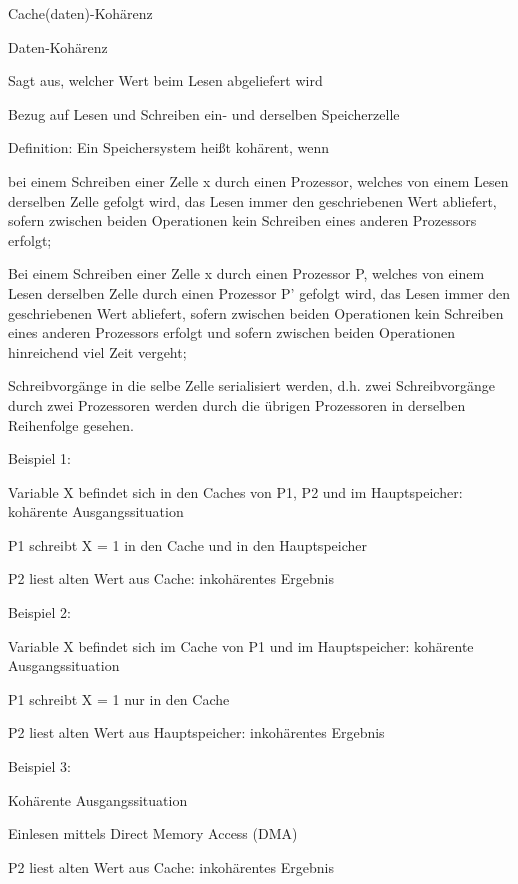 \documentclass[10pt,landscape]{article}
\begin{document}
\begin{multicols}{3}
  Cache(daten)-Kohärenz
  \begin{itemize*}
    \item Daten-Kohärenz
    \item Sagt aus, welcher Wert beim Lesen abgeliefert wird
    \item Bezug auf Lesen und Schreiben ein- und derselben Speicherzelle
    \item Definition: Ein Speichersystem heißt kohärent, wenn
    \item bei einem Schreiben einer Zelle x durch einen Prozessor, welches von einem Lesen derselben Zelle gefolgt wird, das Lesen immer den geschriebenen Wert abliefert, sofern zwischen beiden Operationen kein Schreiben eines anderen Prozessors erfolgt;
    \item Bei einem Schreiben einer Zelle x durch einen Prozessor P, welches von einem Lesen derselben Zelle durch einen Prozessor P’ gefolgt wird, das Lesen immer den geschriebenen Wert abliefert, sofern zwischen beiden Operationen kein Schreiben eines anderen Prozessors erfolgt und sofern zwischen beiden Operationen hinreichend viel Zeit vergeht;
    \item Schreibvorgänge in die selbe Zelle serialisiert werden, d.h. zwei Schreibvorgänge durch zwei Prozessoren werden durch die übrigen Prozessoren in derselben Reihenfolge gesehen.
    \item Beispiel 1: 
    \item Variable X befindet sich in den Caches von P1, P2 und im Hauptspeicher: kohärente Ausgangssituation
    \item P1 schreibt X = 1 in den Cache und in den Hauptspeicher
    \item P2 liest alten Wert aus Cache: inkohärentes Ergebnis
    \item Beispiel 2: 
    \item Variable X befindet sich im Cache von P1 und im Hauptspeicher: kohärente Ausgangssituation
    \item P1 schreibt X = 1 nur in den Cache
    \item P2 liest alten Wert aus Hauptspeicher: inkohärentes Ergebnis
    \item Beispiel 3:
    \item Kohärente Ausgangssituation
    \item Einlesen mittels Direct Memory Access (DMA)
    \item P2 liest alten Wert aus Cache: inkohärentes Ergebnis

\end{itemize*}
\end{multicols}
\end{document}
